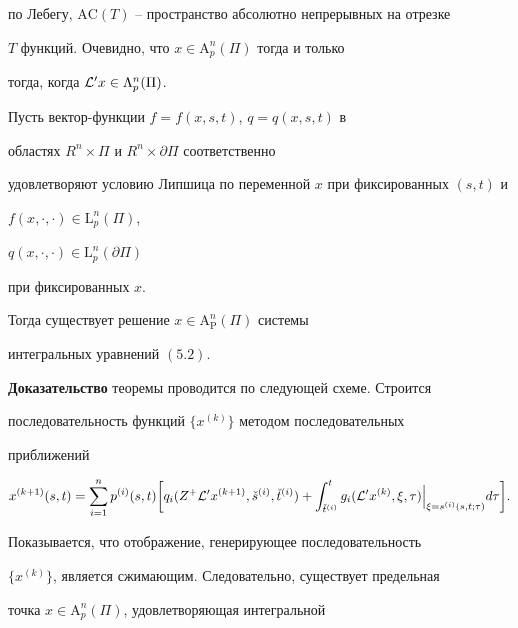 по Лебегу, ${\mathrm {AC}}(T)$ -- пространство абсолютно непрерывных на отрезке


$T$ функций. Очевидно, что $x \in {\mathrm A}_{p}^n ({\Pi})$ тогда и только


тогда, когда ${\cal L}^{\prime}x \in \Lambda_{p}^n ({\Pi})$.





\begin{thms}


Пусть вектор-функции $f=f(x,s,t)$, $q=q(x,s,t)$ в 


областях $R^n \times {\Pi}$ и $R^n \times \partial {\Pi}$ соответственно 


удовлетворяют условию Липшица по переменной $x$ при фиксированных $(s,t)$ и 


$f(x,\cdot,\cdot) \in {\mathrm L}_{p}^n ({\Pi})$, 


$q(x,\cdot,\cdot) \in {\mathrm L}_{p}^n (\partial {\Pi})$ 


при фиксированных $x$. 


Тогда существует решение $x \in {\mathrm A}_{\mathrm P}^n ({\Pi})$ системы 


интегральных уравнений $(5.2)$.


\end{thms}





{\bf Доказательство} теоремы проводится по следующей схеме. Строится 


последовательность функций $\{ x^{(k)} \}$ методом последовательных 


приближений


$$ 


x^{(k+1)} (s,t)=\sum_{i=1}^n p^{(i)} (s,t) \bigg[ q_i (Z^{+}


{\cal L}^{\prime} x^{(k+1)}, \check{s}^{(i)}, \check{t}^{(i)}) +


\int_{\check{t}^{(i)}}^{t} 


g_{i} ({\cal L}^{\prime}x^{(k)}, \xi, \tau) \Big|_{\xi=


s^{(i)}(s,t; \tau)} d\tau \bigg]. 


$$


Показывается, что отображение, генерирующее последовательность 


$\{ x^{(k)} \}$, является сжимающим. Следовательно, существует предельная 


точка $x \in {\mathrm A}_{p}^{n} ({\Pi})$, удовлетворяющая интегральной 


